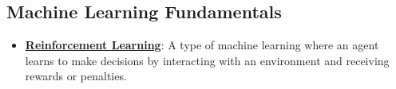 \documentclass{article}%
\begin{document}
%
\subsection{Machine Learning Fundamentals}%
\label{subsec:MachineLearningFundamentals}%
\begin{itemize}[leftmargin=*]%
\item \href{\url{https://purdue.brightspace.com/d2l/common/assets/pdfjs-d2l-dist/1.0.14-legacy/web/viewer.html?file=\%252Fcontent\%252Fenforced\%252F1095467-wl.202510.CS.24300.001\%252F02L2-Intro.pdf\%253Fou\%253D1095467\&lang=en-us\&container=d2l-fileviewer-rendered-pdf\&fullscreen=d2l-fileviewer-rendered-pdf-dialog\&height=667}#page=46}{\textbf{Reinforcement Learning}}: A type of machine learning where an agent learns to make decisions by interacting with an environment and receiving rewards or penalties.%
\end{itemize}

%
\end{document}
